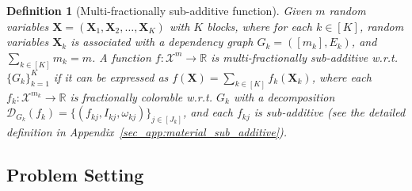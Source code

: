 \documentclass{article}
\def\sR{\mathbb{R}}
\def\mX{{\mathbf{X}}}
\newtheorem{definition}{Definition}
\begin{document}
\begin{definition}[Multi-fractionally sub-additive function]
\label{def: franctionally colorable multi}
    Given $m$ random variables $\mX = (\mX_1, \mX_2, \dots, \mX_K)$ with $K$ blocks, where for each $k \in [K]$, random variables $\mX_k$ is associated with a dependency graph \(G_k = ([m_k], E_k)\), and $\sum_{k \in [K]} m_k = m$. A function $f: \mathcal{X}^{m} \rightarrow \sR$ is \emph{multi-fractionally sub-additive} w.r.t. $\{G_k\}_{k=1}^K$ if it can be expressed as $f(\mX) = \sum_{k \in [K]} f_k(\mX_k)$, where each $f_k: \mathcal{X}^{m_k} \rightarrow \sR$ is fractionally colorable w.r.t. $G_k$ with a decomposition $\mathcal{D}_{G_k}(f_k) = \{ (f_{kj}, I_{kj}, \omega_{kj}) \}_{j \in [J_k]}$, 
    and each $f_{kj}$ is sub-additive (see the detailed definition 
    in Appendix~\ref{sec_app:material_sub_additive}).
\end{definition}





\subsection{Problem Setting}
\end{document}
